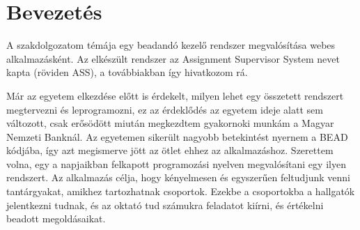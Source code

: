 \chapter{Bevezetés}
\label{ch:intro}

A szakdolgozatom témája egy beadandó kezelő rendszer megvalósítása webes alkalmazásként. Az elkészült rendszer az Assignment Supervisor System nevet kapta (röviden ASS), a továbbiakban így hivatkozom rá.

Már az egyetem elkezdése előtt is érdekelt, milyen lehet egy összetett rendszert megtervezni és leprogramozni, ez az érdeklődés az egyetem ideje alatt sem változott, csak erősödött miután megkezdtem gyakornoki munkám a Magyar Nemzeti Banknál. Az egyetemen sikerült nagyobb betekintést nyernem a BEAD kódjába, így azt megismerve jött az ötlet ehhez az alkalmazáshoz. Szerettem volna, egy a napjaikban felkapott programozási nyelven megvalósítani egy ilyen rendszert. Az alkalmazás célja, hogy kényelmesen és egyszerűen feltudjunk venni tantárgyakat, amikhez tartozhatnak csoportok. Ezekbe a csoportokba a hallgatók jelentkezni tudnak, és az oktató tud számukra feladatot kiírni, és értékelni beadott megoldásaikat.